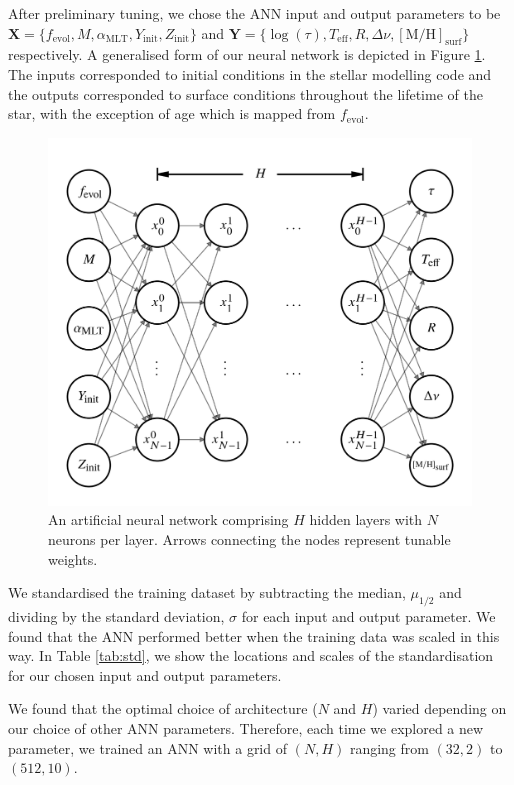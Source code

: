 \documentclass[a4paper,fleqn,usenatbib]{mnras}
\newcommand{\dnu}{\ensuremath{\Delta\nu}}
\newcommand{\metallicity}{\ensuremath{[\mathrm{M}/\mathrm{H}]}}
\newcommand{\teff}{\ensuremath{T_\mathrm{eff}}}
\newcommand{\mlt}{\ensuremath{{\alpha_\mathrm{MLT}}}}
\begin{document}
After preliminary tuning, we chose the ANN input and output parameters to be $\boldsymbol{X} = \{f_\mathrm{evol}, M, \mlt, Y_\mathrm{init}, Z_\mathrm{init}\}$ and $\boldsymbol{Y} = \{\log(\tau), \teff, R, \dnu, \metallicity_\mathrm{surf}\}$ respectively. A generalised form of our neural network is depicted in Figure \ref{fig:net}. The inputs corresponded to initial conditions in the stellar modelling code and the outputs corresponded to surface conditions throughout the lifetime of the star, with the exception of age which is mapped from $f_\mathrm{evol}$.

\begin{figure}
    \includegraphics[width=\linewidth]{figures/network_10.png}
    \caption{An artificial neural network comprising $H$ hidden layers with $N$ neurons per layer. Arrows connecting the nodes represent tunable weights.}
    \label{fig:net}
\end{figure}

We standardised the training dataset by subtracting the median, $\mu_{1/2}$ and dividing by the standard deviation, $\sigma$ for each input and output parameter. We found that the ANN performed better when the training data was scaled in this way. In Table \ref{tab:std}, we show the locations and scales of the standardisation for our chosen input and output parameters.

We found that the optimal choice of architecture ($N$ and $H$) varied depending on our choice of other ANN parameters. Therefore, each time we explored a new parameter, we trained an ANN with a grid of $(N,H)$ ranging from $(32, 2)$ to $(512, 10)$.
\end{document}
